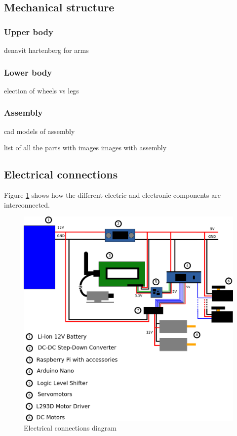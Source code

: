 \subsection{Mechanical structure}
\subsubsection{Upper body}
denavit hartenberg for arms

\subsubsection{Lower body}
election of wheels vs legs

\subsubsection{Assembly}
cad models of assembly

list of all the parts with images
images with assembly 

\newpage
\subsection{Electrical connections}

Figure \ref{electricDiagram} shows how the different electric and electronic components are interconnected.

	\begin{figure}[H]
			\centering
			\includegraphics[width=15cm, angle=0]{images/Diagrams/electrical.png}
			\caption{Electrical connections diagram }
			\label{electricDiagram}
	\end{figure}
	\bigskip